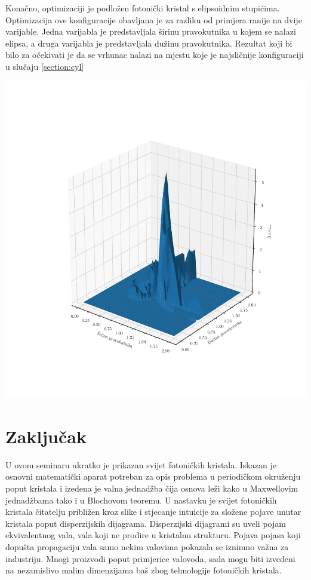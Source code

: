 \documentclass[utf8, seminar, numeric]{fer}
\begin{document}
Konačno, optimizaciji je podložen fotonički kristal s elipsoidnim stupićima.
Optimizacija ove konfiguracije obavljana je za razliku od primjera ranije na
dvije varijable. Jedna varijabla je predstavljala širinu pravokutnika u kojem se
nalazi elipsa, a druga varijabla je predstavljala dužinu pravokutnika.
Rezultat koji bi bilo za očekivati je da se vrhunac nalazi na mjestu koje je
najsličnije konfiguraciji u slučaju \ref{section:cyl}

\includegraphics[width=0.8\linewidth]{./images/pdf/ellipsoid_optimization.pdf}


\chapter{Zaključak}

U ovom seminaru ukratko je prikazan svijet fotoničkih kristala. Iskazan je osnovni
matematički aparat potreban za opis problema u periodičkom okruženju poput
kristala i izedena je valna jednadžba čija osnova leži kako u Maxwellovim
jednadžbama tako i u Blochovom teoremu. U nastavku je svijet fotoničkih kristala
čitatelju približen kroz slike i stjecanje intuicije za složene pojave unutar
kristala poput disperzijskih dijagrama. Disperzijski dijagrami su uveli pojam
ekvivalentnog vala, vala koji ne prodire u kristalnu strukturu. Pojava pojasa
koji dopušta propagaciju vala samo nekim valovima pokazala se iznimno važna
za industriju. Mnogi proizvodi poput primjerice valovoda, sada mogu biti
izvedeni na nezamislivo malim dimenzijama baš zbog tehnologije fotoničkih
kristala.
\end{document}
